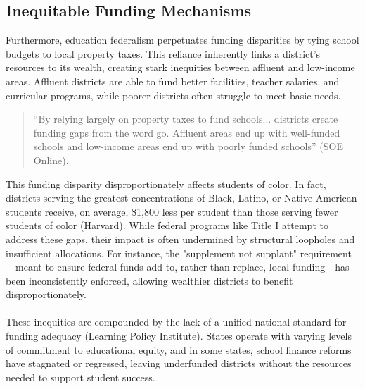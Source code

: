 \documentclass[11pt]{extarticle}
\begin{document}
\subsection{Inequitable Funding Mechanisms}
Furthermore, education federalism perpetuates funding disparities by tying school budgets to local property taxes. This reliance inherently links a district’s resources to its wealth, creating stark inequities between affluent and low-income areas. Affluent districts are able to fund better facilities, teacher salaries, and curricular programs, while poorer districts often struggle to meet basic needs.
\begin{quote}
  ``By relying largely on property taxes to fund schools... districts create funding gaps from the word go. Affluent areas end up with well-funded schools and low-income areas end up with poorly funded schools” (SOE Online).
\end{quote}
This funding disparity disproportionately affects students of color. In fact, districts serving the greatest concentrations of Black, Latino, or Native American students receive, on average, \$1,800 less per student than those serving fewer students of color (Harvard). While federal programs like Title I attempt to address these gaps, their impact is often undermined by structural loopholes and insufficient allocations. For instance, the "supplement not supplant" requirement—meant to ensure federal funds add to, rather than replace, local funding—has been inconsistently enforced, allowing wealthier districts to benefit disproportionately.\\
\\
These inequities are compounded by the lack of a unified national standard for funding adequacy (Learning Policy Institute). States operate with varying levels of commitment to educational equity, and in some states, school finance reforms have stagnated or regressed, leaving underfunded districts without the resources needed to support student success.
\end{document}
